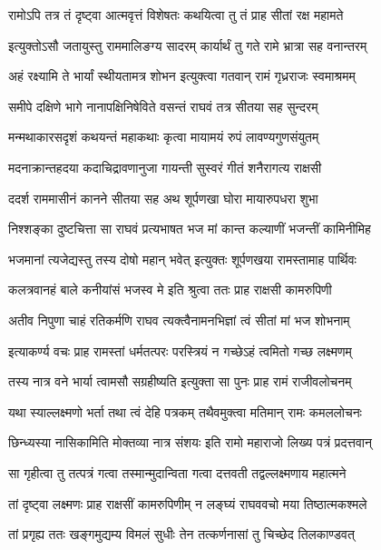 \twolineshloka
{रामोऽपि तत्र तं दृष्ट्वा आत्मवृत्तं विशेषतः}
{कथयित्वा तु तं प्राह सीतां रक्ष महामते} %

\twolineshloka
{इत्युक्तोऽसौ जतायुस्तु राममालिङग्य सादरम्}
{कार्यार्थं तु गते रामे भ्रात्रा सह वनान्तरम्} %

\twolineshloka
{अहं रक्ष्यामि ते भार्यां स्थीयतामत्र शोभन}
{इत्युक्त्वा गतवान् रामं गृध्रराजः स्वमाश्रमम्} %

\twolineshloka
{समीपे दक्षिणे भागे नानापक्षिनिषेविते}
{वसन्तं राघवं तत्र सीतया सह सुन्दरम्} %

\twolineshloka
{मन्मथाकारसदृशं कथयन्तं महाकथाः}
{कृत्वा मायामयं रुपं लावण्यगुणसंयुतम्} %

\twolineshloka
{मदनाक्रान्तहदया कदाचिद्रावणानुजा}
{गायन्ती सुस्वरं गीतं शनैरागत्य राक्षसी} %

\twolineshloka
{ददर्श राममासीनं कानने सीतया सह}
{अथ शूर्पणखा घोरा मायारुपधरा शुभा} %

\twolineshloka
{निश्शङ्का दुष्टचित्ता सा राघवं प्रत्यभाषत}
{भज मां कान्त कल्याणीं भजन्तीं कामिनीमिह} %

\twolineshloka
{भजमानां त्यजेद्यस्तु तस्य दोषो महान् भवेत्}
{इत्युक्तः शूर्पणखया रामस्तामाह पार्थिवः} %

\twolineshloka
{कलत्रवानहं बाले कनीयांसं भजस्व मे}
{इति श्रुत्वा ततः प्राह राक्षसी कामरुपिणी} %

\twolineshloka
{अतीव निपुणा चाहं रतिकर्मणि राघव}
{त्यक्त्वैनामनभिज्ञां त्वं सीतां मां भज शोभनाम्} %

\twolineshloka
{इत्याकर्ण्य वचः प्राह रामस्तां धर्मतत्परः}
{परस्त्रियं न गच्छेऽहं त्वमितो गच्छ लक्ष्मणम्} %

\twolineshloka
{तस्य नात्र वने भार्या त्वामसौ सग्रहीष्यति}
{इत्युक्ता सा पुनः प्राह रामं राजीवलोचनम्} %

\twolineshloka
{यथा स्याल्लक्ष्मणो भर्ता तथा त्वं देहि पत्रकम्}
{तथैवमुक्त्वा मतिमान् रामः कमललोचनः} %

\twolineshloka
{छिन्ध्यस्या नासिकामिति मोक्तव्या नात्र संशयः}
{इति रामो महाराजो लिख्य पत्रं प्रदत्तवान्} %

\twolineshloka
{सा गृहीत्वा तु तत्पत्रं गत्वा तस्मान्मुदान्विता}
{गत्वा दत्तवती तद्वल्लक्ष्मणाय महात्मने} %

\twolineshloka
{तां दृष्ट्वा लक्ष्मणः प्राह राक्षसीं कामरुपिणीम्}
{न लङ्घ्यं राघववचो मया तिष्ठात्मकश्मले} %

\twolineshloka
{तां प्रगृह्य ततः खङ्गमुद्यम्य विमलं सुधीः}
{तेन तत्कर्णनासां तु चिच्छेद तिलकाण्डवत्} %

